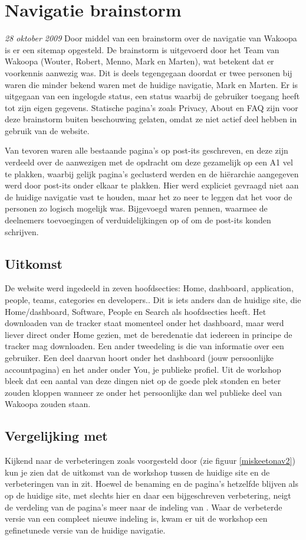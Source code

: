\chapter{Navigatie brainstorm}
    \label{navigationappendix}
\textit{28 oktober 2009} Door middel van een brainstorm over de navigatie van Wakoopa is er een sitemap opgesteld. De brainstorm is uitgevoerd door het Team van Wakoopa (Wouter, Robert, Menno, Mark en Marten), wat betekent dat er voorkennis aanwezig was. Dit is deels tegengegaan doordat er twee personen bij waren die minder bekend waren met de huidige navigatie, Mark en Marten. Er is uitgegaan van een ingelogde status, een status waarbij de gebruiker toegang heeft tot zijn eigen gegevens. Statische pagina's zoals Privacy, About en FAQ zijn voor deze brainstorm buiten beschouwing gelaten, omdat ze niet actief deel hebben in gebruik van de website.

Van tevoren waren alle bestaande pagina's op post-its geschreven, en deze zijn verdeeld over de aanwezigen met de opdracht om deze gezamelijk op een A1 vel te plakken, waarbij gelijk pagina's geclusterd werden en de hi\"erarchie aangegeven werd door post-its onder elkaar te plakken. Hier werd expliciet gevraagd niet aan de huidige navigatie vast te houden, maar het zo neer te leggen dat het voor de personen zo logisch mogelijk was. Bijgevoegd waren pennen, waarmee de deelnemers toevoegingen of verduidelijkingen op of om de post-its konden schrijven.

\section*{Uitkomst}
De website werd ingedeeld in zeven hoofdsecties: Home, dashboard, application, people, teams, categories en developers.. Dit is iets anders dan de huidige site, die Home/dashboard, Software, People en Search als hoofdsecties heeft. Het downloaden van de tracker staat momenteel onder het dashboard, maar werd liever direct onder Home gezien, met de beredenatie dat iedereen in principe de tracker mag downloaden. Een ander tweedeling is die van informatie over een gebruiker. Een deel daarvan hoort onder het dashboard (jouw persoonlijke accountpagina) en het ander onder You, je publieke profiel. Uit de workshop bleek dat een aantal van deze dingen niet op de goede plek stonden en beter zouden kloppen wanneer ze onder het persoonlijke dan wel publieke deel van Wakoopa zouden staan.
\section*{Vergelijking met \citeauthor{Hoekman2008}}
Kijkend naar de verbeteringen zoals voorgesteld door \citeauthor{Hoekman2008} (zie figuur \ref{miskeetonav2}) kun je zien dat de uitkomst van de workshop tussen de huidige site en de verbeteringen van \citeauthor{Hoekman2008} in zit. Hoewel de benaming en de pagina's hetzelfde blijven als op de huidige site, met slechts hier en daar een bijgeschreven verbetering, neigt de verdeling van de pagina's meer naar de indeling van \citeauthor{Hoekman2008}. Waar de verbeterde versie van \citeauthor{Hoekman2008} een compleet nieuwe indeling is, kwam er uit de workshop een gefinetunede versie van de huidige navigatie.

